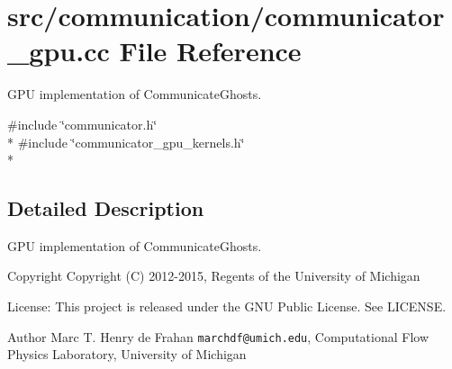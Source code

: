 \section{src/communication/communicator\-\_\-gpu.cc File Reference}
\label{communicator__gpu_8cc}


G\-P\-U implementation of Communicate\-Ghosts.  


{\ttfamily \#include \char`\"{}communicator.\-h\char`\"{}}\\*
{\ttfamily \#include \char`\"{}communicator\-\_\-gpu\-\_\-kernels.\-h\char`\"{}}\\*


\subsection{Detailed Description}
G\-P\-U implementation of Communicate\-Ghosts. \begin{DoxyCopyright}{Copyright}
Copyright (C) 2012-\/2015, Regents of the University of Michigan 
\end{DoxyCopyright}
\begin{DoxyParagraph}{License\-:}
This project is released under the G\-N\-U Public License. See L\-I\-C\-E\-N\-S\-E. 
\end{DoxyParagraph}
\begin{DoxyAuthor}{Author}
Marc T. Henry de Frahan {\tt marchdf@umich.\-edu}, Computational Flow Physics Laboratory, University of Michigan 
\end{DoxyAuthor}
